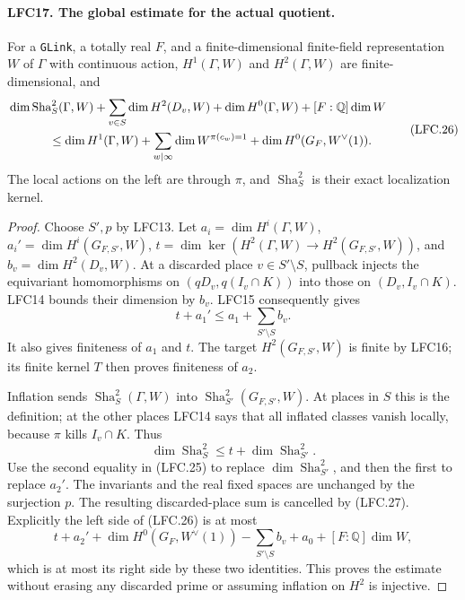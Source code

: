 \paragraph{LFC17. The global estimate for the actual quotient.}
\label{claim:LFC17}
For a \texttt{GLink}, a totally real \(F\), and a
finite-dimensional finite-field representation \(W\)
of \(\Gamma\) with continuous action, \(H^1(\Gamma,W)\)
and \(H^2(\Gamma,W)\) are finite-dimensional, and
\[
 \begin{split}
 &\dim\operatorname{Sha}^2_S(\Gamma,W)+
       \sum_{v\in S}\dim H^2(D_v,W)+\dim H^0(\Gamma,W)
                          +[F:\mathbb Q]\dim W\\
 &\hspace{12mm}\le
       \dim H^1(\Gamma,W)+
       \sum_{w\mid\infty}\dim W^{\pi(c_w)=1}
       +\dim H^0(G_F,W^\vee(1)).
 \end{split}                                           \tag{LFC.26}
\]
The local actions on the left are through \(\pi\), and
\(\operatorname{Sha}^2_S\) is their exact localization kernel.

\begin{proof}
Choose \(S',p\) by LFC13.
Let \(a_i=\dim H^i(\Gamma,W)\),
\(a_i'=\dim H^i(G_{F,S'},W)\),
\(t=\dim\ker(H^2(\Gamma,W)\to H^2(G_{F,S'},W))\),
and \(b_v=\dim H^2(D_v,W)\).
At a discarded place \(v\in S'\setminus S\), pullback
injects the equivariant homomorphisms on
\((qD_v,q(I_v\cap K))\) into those on \((D_v,I_v\cap K)\).
LFC14 bounds their dimension by \(b_v\).
LFC15 consequently gives
\[
                     t+a_1'\le a_1+\sum_{S'\setminus S}b_v.
                                                        \tag{LFC.27}
\]
It also gives finiteness of \(a_1\) and \(t\).
The target \(H^2(G_{F,S'},W)\) is finite by LFC16;
its finite kernel \(T\) then proves finiteness of \(a_2\).

Inflation sends \(\operatorname{Sha}^2_S(\Gamma,W)\) into
\(\operatorname{Sha}^2_{S'}(G_{F,S'},W)\).
At places in \(S\) this is the definition; at the other
places LFC14 says that all inflated classes vanish
locally, because \(\pi\) kills \(I_v\cap K\).
Thus
\[
             \dim\operatorname{Sha}^2_S\le t+\dim\operatorname{Sha}^2_{S'}.
 \]
Use the second equality in (LFC.25) to replace
\(\dim\operatorname{Sha}^2_{S'}\), and then the first to replace
\(a_2'\).  The invariants and the real fixed spaces
are unchanged by the surjection \(p\).
The resulting discarded-place sum is cancelled by
(LFC.27).  Explicitly the left side of (LFC.26) is at most
\[
 t+a_2'+\dim H^0(G_F,W^\vee(1))
     -\sum_{S'\setminus S}b_v+a_0+[F:\mathbb Q]\dim W,
 \]
which is at most its right side by these two identities.
This proves the estimate without erasing any discarded
prime or assuming inflation on \(H^2\) is injective.
\end{proof}

